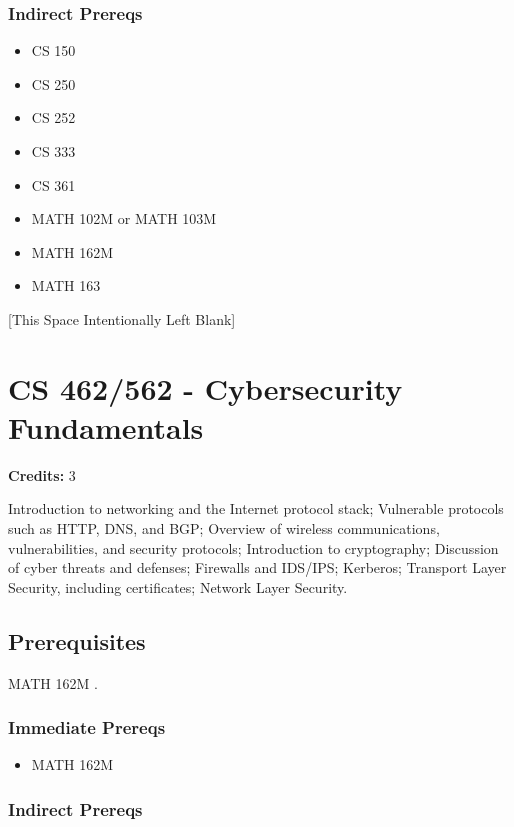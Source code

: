 \documentclass[]{article}
\providecommand{\tightlist}{%
  \setlength{\itemsep}{0pt}\setlength{\parskip}{0pt}}
\newcommand{\pagebreakhere}{
\vspace*{\fill}
\begin{center}
[This Space Intentionally Left Blank]
\end{center}
\vspace*{\fill}
\newpage
}
\begin{document}
\subsubsection{Indirect Prereqs}\label{indirect-prereqs-29}

\begin{itemize}
\tightlist
\item
  CS 150
\item
  CS 250
\item
  CS 252
\item
  CS 333
\item
  CS 361
\item
  MATH 102M or MATH 103M
\item
  MATH 162M
\item
  MATH 163
\end{itemize}

\pagebreakhere
\section{CS 462/562 - Cybersecurity
Fundamentals}\label{cs-462562---cybersecurity-fundamentals}

\textbf{Credits:} 3

Introduction to networking and the Internet protocol stack; Vulnerable
protocols such as HTTP, DNS, and BGP; Overview of wireless
communications, vulnerabilities, and security protocols; Introduction to
cryptography; Discussion of cyber threats and defenses; Firewalls and
IDS/IPS; Kerberos; Transport Layer Security, including certificates;
Network Layer Security.

\subsection{Prerequisites}\label{prerequisites-39}

MATH 162M .

\subsubsection{Immediate Prereqs}\label{immediate-prereqs-30}

\begin{itemize}
\tightlist
\item
  MATH 162M
\end{itemize}

\subsubsection{Indirect Prereqs}\label{indirect-prereqs-30}
\end{document}
